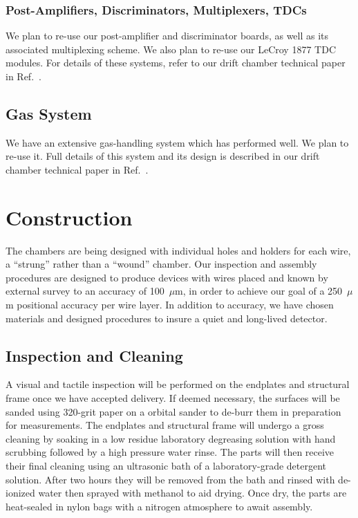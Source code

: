\documentclass[12pt]{article}
\begin{document}
\subsubsection{Post-Amplifiers, Discriminators, Multiplexers, TDCs}

We plan to re-use our post-amplifier and discriminator boards, as well
as its associated multiplexing scheme.  We also plan to re-use our
LeCroy 1877 TDC modules.  For details of these systems, refer to our
drift chamber technical paper in Ref.~\cite{dcnim}.

\subsection{Gas System}

We have an extensive gas-handling system which has performed well.
We plan to re-use it.  Full details of this system and its design is 
described in our drift chamber technical paper in Ref.~\cite{dcnim}.



\section{Construction}

The chambers are being designed with individual holes and holders for
each wire, a ``strung'' rather than a ``wound'' chamber.  Our inspection
and assembly procedures are designed to produce devices with wires placed
and known by external survey to an accuracy of 100~$\mu$m, in order to
achieve our goal of a 250~$\mu$m positional accuracy per wire layer.  In 
addition to accuracy, we have chosen materials and designed procedures to 
insure a quiet and long-lived detector.

\subsection{Inspection and Cleaning}

A visual and tactile inspection will be performed on the endplates and 
structural frame once we have accepted delivery.  If deemed necessary, 
the surfaces will be sanded using 320-grit paper on a orbital sander to 
de-burr them in preparation for measurements.  The endplates and structural 
frame will undergo a gross cleaning by soaking in a low residue laboratory 
degreasing solution with hand scrubbing followed by a high pressure water 
rinse. The parts will then receive their final cleaning using an ultrasonic 
bath of a laboratory-grade detergent solution.  After two hours they will be 
removed from the bath and rinsed with de-ionized water then sprayed with 
methanol to aid drying. Once dry, the parts are heat-sealed in nylon bags 
with a nitrogen atmosphere to await assembly.
\end{document}
